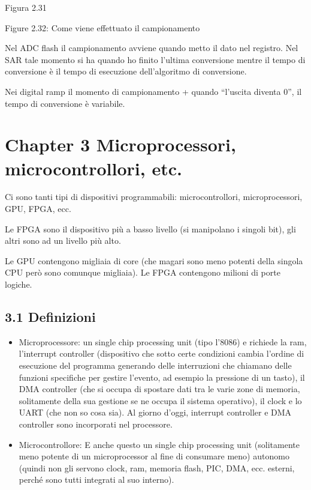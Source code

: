 \documentclass[
]{article}
\providecommand{\tightlist}{%
  \setlength{\itemsep}{0pt}\setlength{\parskip}{0pt}}
\begin{document}
Figura 2.31

Figure 2.32: Come viene effettuato il campionamento

Nel ADC flash il campionamento avviene quando metto il dato nel
registro. Nel SAR tale momento si ha quando ho finito l'ultima
conversione mentre il tempo di conversione è il tempo di esecuzione
dell'algoritmo di conversione.

Nei digital ramp il momento di campionamento + quando ``l'uscita diventa
0'', il tempo di conversione è variabile.

\section{Chapter 3 Microprocessori, microcontrollori,
etc.}\label{chapter-3-microprocessori-microcontrollori-etc.}

Ci sono tanti tipi di dispositivi programmabili: microcontrollori,
microprocessori, GPU, FPGA, ecc.

Le FPGA sono il dispositivo più a basso livello (si manipolano i singoli
bit), gli altri sono ad un livello più alto.

Le GPU contengono migliaia di core (che magari sono meno potenti della
singola CPU però sono comunque migliaia). Le FPGA contengono milioni di
porte logiche.

\subsection{3.1 Definizioni}\label{definizioni}

\begin{itemize}
\tightlist
\item
  Microprocessore: un single chip processing unit (tipo l'8086) e
  richiede la ram, l'interrupt controller (dispositivo che sotto certe
  condizioni cambia l'ordine di esecuzione del programma generando delle
  interruzioni che chiamano delle funzioni specifiche per gestire
  l'evento, ad esempio la pressione di un tasto), il DMA controller (che
  si occupa di spostare dati tra le varie zone di memoria, solitamente
  della sua gestione se ne occupa il sistema operativo), il clock e lo
  UART (che non so cosa sia). Al giorno d'oggi, interrupt controller e
  DMA controller sono incorporati nel processore.
\item
  Microcontrollore: E anche questo un single chip processing unit
  (solitamente meno potente di un microprocessor al fine di consumare
  meno) autonomo (quindi non gli servono clock, ram, memoria flash, PIC,
  DMA, ecc. esterni, perché sono tutti integrati al suo interno).
\end{itemize}
\end{document}
